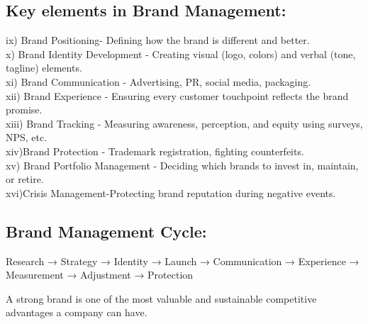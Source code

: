 \documentclass[10pt]{article}
\begin{document}
\subsection*{Key elements in Brand Management:}
ix) Brand Positioning- Defining how the brand is different and better.\\
x) Brand Identity Development - Creating visual (logo, colors) and verbal (tone, tagline) elements.\\
xi) Brand Communication - Advertising, PR, social media, packaging.\\
xii) Brand Experience - Ensuring every customer touchpoint reflects the brand promise.\\
xiii) Brand Tracking - Measuring awareness, perception, and equity using surveys, NPS, etc.\\
xiv)Brand Protection - Trademark registration, fighting counterfeits.\\
xv) Brand Portfolio Management - Deciding which brands to invest in, maintain, or retire.\\
xvi)Crisis Management-Protecting brand reputation during negative events.

\subsection*{Brand Management Cycle:}
Research → Strategy → Identity → Launch → Communication → Experience → Measurement → Adjustment → Protection

A strong brand is one of the most valuable and sustainable competitive advantages a company can have.
\end{document}
